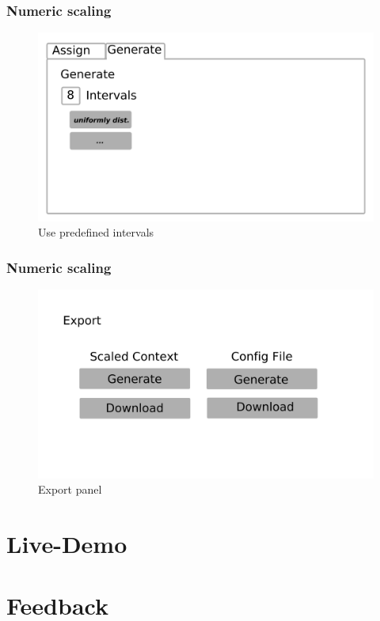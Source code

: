 \documentclass[]{beamer}
\begin{document}
	\begin{frame}
		\frametitle{Numeric scaling}
		\begin{figure}[H]
			\includegraphics[width=\linewidth]{../mock_up/num_gen.png}
			\caption{Use predefined intervals}
			\label{fig:p1}
		\end{figure}
	\end{frame}

	\begin{frame}
		\frametitle{Numeric scaling}
		\begin{figure}[H]
			\includegraphics[width=\linewidth]{../mock_up/export.png}
			\caption{Export panel}
			\label{fig:p1}
		\end{figure}
	\end{frame}

\section[]{Live-Demo}

\section[]{Feedback}
\end{document}
